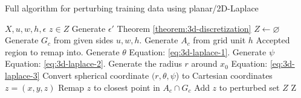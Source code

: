 \begin{algorithm}[H]
  \caption{Full algorithm for perturbing training data using planar/2D-Laplace \citep{DBLP:journals/corr/abs-1212-1984}}\label{alg:rq1}
  \begin{algorithmic}
    \Require $X, u, w, h, \epsilon$
    \Ensure $z \in Z$ 
    \State Generate $\epsilon'$ \Comment Theorem \ref{theorem:3d-discretization}
    \State $Z \gets \varnothing$ 
    \State Generate $G_c$ from given sides $u, w, h$.
    \State Generate $A_c$ from grid unit $h$ \Comment Accepted region to remap into.
    \State Generate $\theta$      \Comment  Equation: \ref{eq:3d-laplace-1}.
    \State Generate  $\psi$     \Comment Equation: \ref{eq:3d-laplace-2}.
    \State Generate the radius $r$ around $x_0$          \Comment Equation: \ref{eq:3d-laplace-3}
    \State Convert spherical coordinate $(r, \theta, \psi$) to Cartesian coordinates $z = (x, y, z)$ 
        \State Remap $z$ to closest point in $A_c \cap G_c$ 
    \EndIf
    \State Add $z$ to perturbed set $Z$  
    \EndFor
    \State \Return Z
  \end{algorithmic}
  \label{alg:3d-laplace}
\end{algorithm}